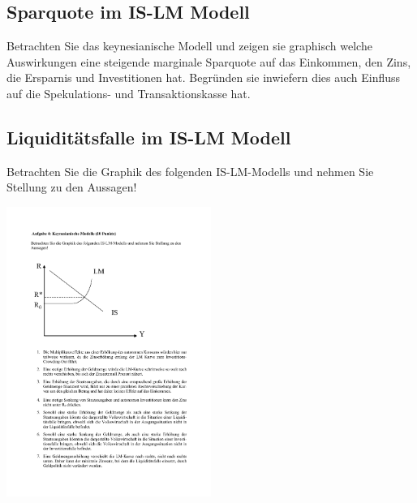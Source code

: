 \documentclass{scrartcl}
\begin{document}
\subsection{Sparquote im IS-LM Modell}
Betrachten Sie das keynesianische Modell und zeigen sie graphisch welche Auswirkungen eine steigende marginale Sparquote auf das Einkommen, den Zins, die Ersparnis und Investitionen hat. Begründen sie inwiefern dies auch Einfluss auf die Spekulations- und Transaktionskasse hat.


\subsection{Liquiditätsfalle im IS-LM Modell}
Betrachten Sie die Graphik des folgenden IS-LM-Modells und nehmen Sie
Stellung zu den Aussagen!\\
\begin{center}\includegraphics[width=0.5\textwidth]{Bilder/ISLM2.pdf}\end{center}
\end{document}
